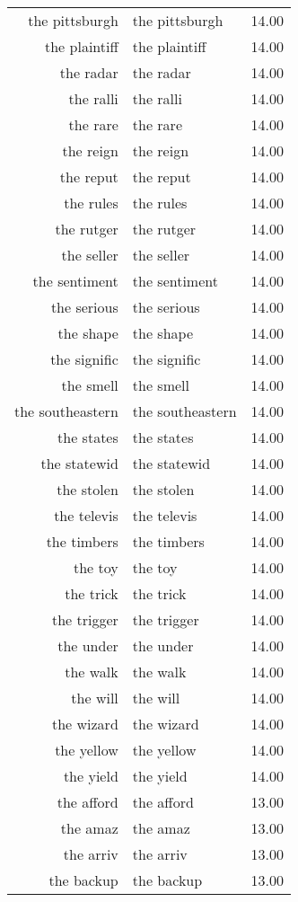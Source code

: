 \begin{table}[ht]
\begin{tabular}{rlr}
  the pittsburgh & the pittsburgh & 14.00 \\ 
  the plaintiff & the plaintiff & 14.00 \\ 
  the radar & the radar & 14.00 \\ 
  the ralli & the ralli & 14.00 \\ 
  the rare & the rare & 14.00 \\ 
  the reign & the reign & 14.00 \\ 
  the reput & the reput & 14.00 \\ 
  the rules & the rules & 14.00 \\ 
  the rutger & the rutger & 14.00 \\ 
  the seller & the seller & 14.00 \\ 
  the sentiment & the sentiment & 14.00 \\ 
  the serious & the serious & 14.00 \\ 
  the shape & the shape & 14.00 \\ 
  the signific & the signific & 14.00 \\ 
  the smell & the smell & 14.00 \\ 
  the southeastern & the southeastern & 14.00 \\ 
  the states & the states & 14.00 \\ 
  the statewid & the statewid & 14.00 \\ 
  the stolen & the stolen & 14.00 \\ 
  the televis & the televis & 14.00 \\ 
  the timbers & the timbers & 14.00 \\ 
  the toy & the toy & 14.00 \\ 
  the trick & the trick & 14.00 \\ 
  the trigger & the trigger & 14.00 \\ 
  the under & the under & 14.00 \\ 
  the walk & the walk & 14.00 \\ 
  the will & the will & 14.00 \\ 
  the wizard & the wizard & 14.00 \\ 
  the yellow & the yellow & 14.00 \\ 
  the yield & the yield & 14.00 \\ 
  the afford & the afford & 13.00 \\ 
  the amaz & the amaz & 13.00 \\ 
  the arriv & the arriv & 13.00 \\ 
  the backup & the backup & 13.00 \\ 

\end{tabular}
\end{table}
